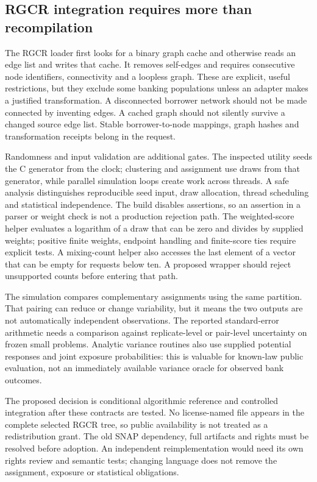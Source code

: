 \subsection{RGCR integration requires more than recompilation}

The RGCR loader first looks for a binary graph cache and otherwise reads an edge list and writes that cache. It removes self-edges and requires consecutive node identifiers, connectivity and a loopless graph. These are explicit, useful restrictions, but they exclude some banking populations unless an adapter makes a justified transformation. A disconnected borrower network should not be made connected by inventing edges. A cached graph should not silently survive a changed source edge list. Stable borrower-to-node mappings, graph hashes and transformation receipts belong in the request.\citep{exec25_cnet_rgcr,exec25_cnet_choice}

Randomness and input validation are additional gates. The inspected utility seeds the C generator from the clock; clustering and assignment use draws from that generator, while parallel simulation loops create work across threads. A safe analysis distinguishes reproducible seed input, draw allocation, thread scheduling and statistical independence. The build disables assertions, so an assertion in a parser or weight check is not a production rejection path. The weighted-score helper evaluates a logarithm of a draw that can be zero and divides by supplied weights; positive finite weights, endpoint handling and finite-score ties require explicit tests. A mixing-count helper also accesses the last element of a vector that can be empty for requests below ten. A proposed wrapper should reject unsupported counts before entering that path.\citep{exec25_cnet_rgcr}

The simulation compares complementary assignments using the same partition. That pairing can reduce or change variability, but it means the two outputs are not automatically independent observations. The reported standard-error arithmetic needs a comparison against replicate-level or pair-level uncertainty on frozen small problems. Analytic variance routines also use supplied potential responses and joint exposure probabilities: this is valuable for known-law public evaluation, not an immediately available variance oracle for observed bank outcomes.\citep{exec25_cnet_rgcr,exec25_cnet_choice}

The proposed decision is conditional algorithmic reference and controlled integration after these contracts are tested. No license-named file appears in the complete selected RGCR tree, so public availability is not treated as a redistribution grant. The old SNAP dependency, full artifacts and rights must be resolved before adoption. An independent reimplementation would need its own rights review and semantic tests; changing language does not remove the assignment, exposure or statistical obligations.\citep{exec25_cnet_choice}

